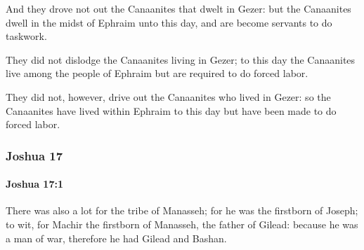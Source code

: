 			\begin{versebox}
					\item[BHS] 
					\item[ASV] And they drove not out the Canaanites that dwelt in Gezer: but the Canaanites dwell in the midst of Ephraim unto this day, and are become servants to do taskwork.
					\item[NIV] They did not dislodge the Canaanites living in Gezer; to this day the Canaanites live among the people of Ephraim but are required to do forced labor.
					\item[NRSV] They did not, however, drive out the Canaanites who lived in Gezer: so the Canaanites have lived within Ephraim to this day but have been made to do forced labor.
			\end{versebox}
	\subsubsection{Joshua 17} %
		\label{JOSHUA-17}

		\paragraph{Joshua 17:1} %
			\label{JOSHUA-17-1}

			There was also a lot for the tribe of Manasseh; for he was the firstborn of Joseph; to wit, for Machir the firstborn of Manasseh, the father of Gilead: because he was a man of war, therefore he had Gilead and Bashan.

